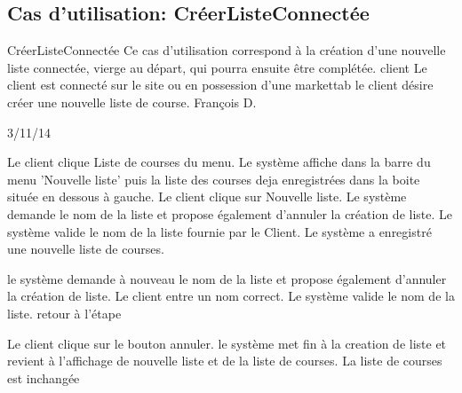 \subsection{Cas d'utilisation: CréerListeConnectée}

\startCU
\nom CréerListeConnectée
\but Ce cas d’utilisation correspond à la création d’une nouvelle liste connectée, vierge au départ, qui pourra ensuite être complétée.
\acteur client
\precondition Le client est connecté sur le site ou en possession d'une markettab
\declenchement le client désire créer une nouvelle liste de course.
\auteur François D.
\date 03/11/14

\nominal %
\startnominal
\etape Le client clique Liste de courses du menu.
\etape Le système affiche dans la barre du menu 'Nouvelle liste' puis la liste des courses deja enregistrées dans la boite située en dessous à gauche.
\etape Le client clique sur Nouvelle liste.
\etape[ANNUL] Le système demande le nom de la liste et propose également d'annuler la création de liste.
\etape[NOMINVAL] Le système valide le nom de la liste fournie par le Client.
\stopnominal
\postcondition Le système a enregistré une nouvelle liste de courses.

\alternatifs %
\startalternatif[NOMINVAL] %
  \etape le système demande à nouveau le nom de la liste et propose également d'annuler la création de liste.
  \etape Le client entre un nom correct.
  \etape Le système valide le nom de la liste.
  \etape retour à l'étape \in[RETOUR]
\stopcondition
\stopalternatif

\exception %
\startalternatif[ANNUL]
  \etape Le client clique sur le bouton annuler.
  \etape le système met fin à la creation de liste et revient à l'affichage de nouvelle liste et de la liste de courses.
\stopcondition
\postcondition La liste de courses est inchangée
\stopalternatif
\stopCU
